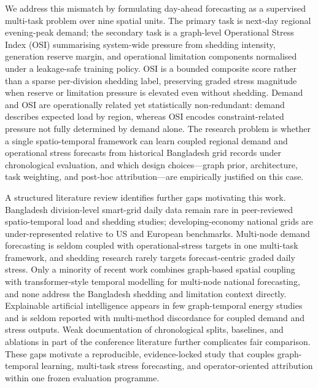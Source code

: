 We address this mismatch by formulating day-ahead forecasting as a supervised multi-task problem \cite{Caruana1997Multitask} over nine spatial units. The primary task is next-day regional evening-peak demand; the secondary task is a graph-level Operational Stress Index (OSI) summarising system-wide pressure from shedding intensity, generation reserve margin, and operational limitation components normalised under a leakage-safe training policy. OSI is a bounded composite score rather than a sparse per-division shedding label, preserving graded stress magnitude when reserve or limitation pressure is elevated even without shedding. Demand and OSI are operationally related yet statistically non-redundant: demand describes expected load by region, whereas OSI encodes constraint-related pressure not fully determined by demand alone. The research problem is whether a single spatio-temporal framework can learn coupled regional demand and operational stress forecasts from historical Bangladesh grid records under chronological evaluation, and which design choices---graph prior, architecture, task weighting, and post-hoc attribution---are empirically justified on this case.

A structured literature review identifies further gaps motivating this work. Bangladesh division-level smart-grid daily data remain rare in peer-reviewed spatio-temporal load and shedding studies; developing-economy national grids are under-represented relative to US and European benchmarks. Multi-node demand forecasting is seldom coupled with operational-stress targets in one multi-task framework, and shedding research rarely targets forecast-centric graded daily stress. Only a minority of recent work combines graph-based spatial coupling with transformer-style temporal modelling \cite{Zhao2024GraphAttentionTransformer,Bentsen2023GraphTransformer,Vaswani2017Attention} for multi-node national forecasting, and none address the Bangladesh shedding and limitation context directly. Explainable artificial intelligence appears in few graph-temporal energy studies \cite{Baur2024XAIReview,Lundberg2017SHAP} and is seldom reported with multi-method discordance for coupled demand and stress outputs. Weak documentation of chronological splits, baselines, and ablations in part of the conference literature further complicates fair comparison. These gaps motivate a reproducible, evidence-locked study that couples graph-temporal learning, multi-task stress forecasting, and operator-oriented attribution within one frozen evaluation programme.

